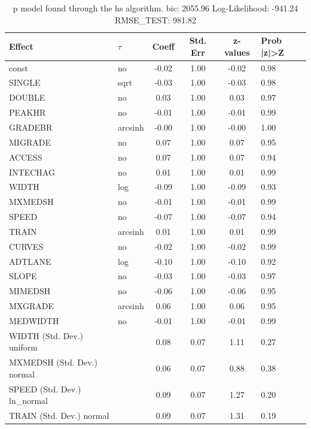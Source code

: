\begin{table}
	\caption{p model found through the hs algorithm. bic: 2055.96 Log-Likelihood: -941.24 RMSE_TEST: 981.82}
	\begin{center}
		\begin{tabular}{|l|l|c|c|c|l|}
			\hline
			Effect & $\tau$ & Coeff & Std. Err & z-values & Prob |z|>Z \\
			\hline
			const & no & -0.02 & 1.00 & -0.02 & 0.98 \\
			\hline
			SINGLE & sqrt & -0.03 & 1.00 & -0.03 & 0.98 \\
			\hline
			DOUBLE & no & 0.03 & 1.00 & 0.03 & 0.97 \\
			\hline
			PEAKHR & no & -0.01 & 1.00 & -0.01 & 0.99 \\
			\hline
			GRADEBR & arcsinh & -0.00 & 1.00 & -0.00 & 1.00 \\
			\hline
			MIGRADE & no & 0.07 & 1.00 & 0.07 & 0.95 \\
			\hline
			ACCESS & no & 0.07 & 1.00 & 0.07 & 0.94 \\
			\hline
			INTECHAG & no & 0.01 & 1.00 & 0.01 & 0.99 \\
			\hline
			WIDTH & log & -0.09 & 1.00 & -0.09 & 0.93 \\
			\hline
			MXMEDSH & no & -0.01 & 1.00 & -0.01 & 0.99 \\
			\hline
			SPEED & no & -0.07 & 1.00 & -0.07 & 0.94 \\
			\hline
			TRAIN & arcsinh & 0.01 & 1.00 & 0.01 & 0.99 \\
			\hline
			CURVES & no & -0.02 & 1.00 & -0.02 & 0.99 \\
			\hline
			ADTLANE & log & -0.10 & 1.00 & -0.10 & 0.92 \\
			\hline
			SLOPE & no & -0.03 & 1.00 & -0.03 & 0.97 \\
			\hline
			MIMEDSH & no & -0.06 & 1.00 & -0.06 & 0.95 \\
			\hline
			MXGRADE & arcsinh & 0.06 & 1.00 & 0.06 & 0.95 \\
			\hline
			MEDWIDTH & no & -0.01 & 1.00 & -0.01 & 0.99 \\
			\hline
			WIDTH (Std. Dev.) uniform &  & 0.08 & 0.07 & 1.11 & 0.27 \\
			\hline
			MXMEDSH (Std. Dev.) normal &  & 0.06 & 0.07 & 0.88 & 0.38 \\
			\hline
			SPEED (Std. Dev.) ln_normal &  & 0.09 & 0.07 & 1.27 & 0.20 \\
			\hline
			TRAIN (Std. Dev.) normal &  & 0.09 & 0.07 & 1.31 & 0.19 \\

\end{tabular}
\end{center}
\end{table}
